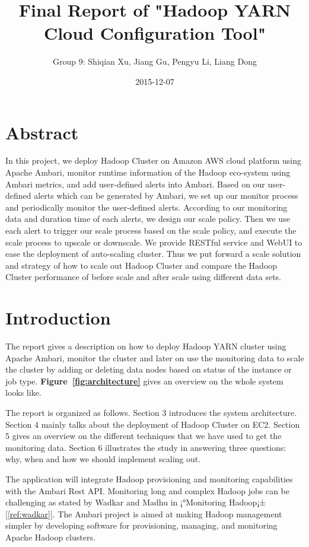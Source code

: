 \documentclass{article}
\title{Final Report of "Hadoop YARN Cloud Configuration Tool"}
\author{Group 9: Shiqian Xu, Jiang Gu, Pengyu Li, Liang Dong}
\affil{Course: Data Intensive Computing}
\date{2015-12-07}
\begin{document}
\maketitle
\newpage
\section{Abstract}
In this project, we deploy Hadoop Cluster on Amazon AWS cloud platform using Apache Ambari, monitor runtime information of the Hadoop eco-system using Ambari metrics, and add user-defined alerts into Ambari. Based on our user-defined alerts which can be generated by Ambari, we set up our monitor process and periodically monitor the user-defined alerts. According to our monitoring data and duration time of each alerts, we design our scale policy. Then we use each alert to trigger our scale process based on the scale policy, and execute the scale process to upscale or downscale. We provide RESTful service and WebUI to ease the deployment of auto-scaling cluster. Thus we put forward a scale solution and strategy of how to scale out Hadoop Cluster and compare the Hadoop Cluster performance of before scale and after scale using different data sets.
	
\section{Introduction}
The report gives a description on how to deploy Hadoop YARN cluster using Apache Ambari, monitor the cluster and later on use the monitoring data to scale the cluster by adding or deleting data nodes based on status of the instance or job type. \textbf{Figure~\ref{fig:architecture}} gives an overview on the whole system looks like.

The report is organized as follows. Section 3 introduces the system architecture. Section 4 mainly talks about the deployment of Hadoop Cluster on EC2. Section 5 gives an overview on the different techniques that we have used to get the monitoring data. Section 6 illustrates the study in answering three questions: why, when and how we should implement scaling out.

The application will integrate Hadoop provisioning and monitoring capabilities with the Ambari Rest API. Monitoring long and complex Hadoop jobs can be challenging as stated by Wadkar and Madhu in ¡°Monitoring Hadoop¡±[\ref{ref:wadkar}]. The Ambari project is aimed at making Hadoop management simpler by developing software for provisioning, managing, and monitoring Apache Hadoop clusters.
\end{document}
